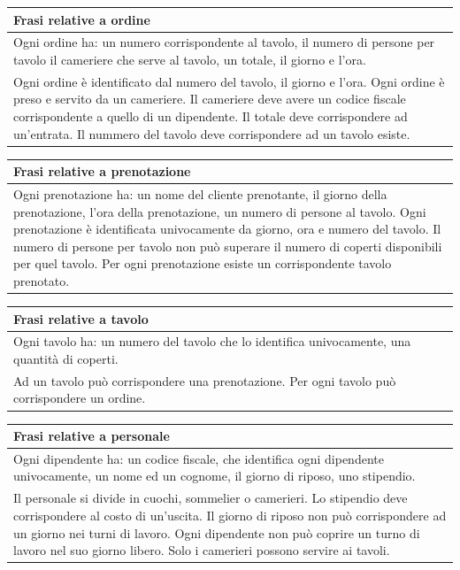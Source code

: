 \begin{longtable}{|p{15.5cm}|}
    \hline
    \textbf{Frasi relative a ordine} \\ \hline
    Ogni ordine ha: un numero corrispondente al tavolo, il numero di persone per tavolo il cameriere che serve al tavolo, un totale, il giorno e l'ora. \\
    Ogni ordine è identificato dal numero del tavolo, il giorno e l’ora.
    Ogni ordine è preso e servito da un cameriere.
    Il cameriere deve avere un codice fiscale corrispondente a quello di un dipendente.
    Il totale deve corrispondere ad un’entrata.
    Il nummero del tavolo deve corrispondere ad un tavolo esiste.
    \\ \hline
\end{longtable}

\begin{longtable}{|p{15.5cm}|}
    \hline
    \textbf{Frasi relative a prenotazione} \\ \hline
    Ogni prenotazione ha: un nome del cliente prenotante, il giorno della prenotazione, l'ora della prenotazione, un numero di persone al tavolo. 
    Ogni prenotazione è identificata univocamente da giorno, ora e numero del tavolo.
    Il numero di persone per tavolo non può superare il numero di coperti disponibili per
    quel tavolo.
    Per ogni prenotazione esiste un corrispondente tavolo prenotato.
    \\ \hline
\end{longtable}

\begin{longtable}{|p{15.5cm}|}
    \hline
    \textbf{Frasi relative a tavolo} \\ \hline
    Ogni tavolo ha: un numero del tavolo che lo identifica univocamente, una quantità di coperti. \\
    Ad un tavolo può corrispondere una prenotazione. 
    Per ogni tavolo può corrispondere un ordine.
    \\ \hline
\end{longtable}

\begin{longtable}{|p{15.5cm}|}
    \hline
    \textbf{Frasi relative a personale} \\ \hline
    Ogni dipendente ha: un codice fiscale, che identifica ogni dipendente univocamente, un nome ed un cognome, il giorno di riposo, uno stipendio. \\
    Il personale si divide in cuochi, sommelier o camerieri.
    Lo stipendio deve corrispondere al costo di un’uscita.
    Il giorno di riposo non può corrispondere ad un giorno nei turni di lavoro.
    Ogni dipendente non può coprire un turno di lavoro nel suo giorno libero.
    Solo i camerieri possono servire ai tavoli.
    \\ \hline
\end{longtable}

